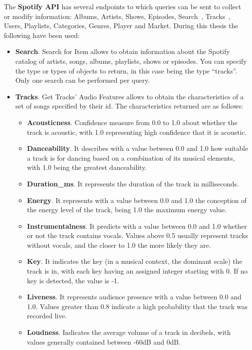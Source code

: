 \nonzeroparskip The \textbf{Spotify API} has several endpoints to which queries can be sent to collect or modify information: Albums, Artists, Shows, Episodes, Search~\cite{spotify_dev_endpoint_searchforitem}, Tracks~\cite{spotify_dev_endpoint_gettracksaudiofeatures}, Users, Playlists, Categories, Genres, Player and Market. During this thesis the following have been used:
\begin{itemize}
	\item \textbf{Search}. Search for Item allows to obtain information about the Spotify catalog of artists, songs, albums, playlists, shows or episodes. You can specify the type or types of objects to return, in this case being the type ``tracks''. Only one search can be performed per query.
	\item \textbf{Tracks}. Get Tracks' Audio Features allows to obtain the characteristics of a set of songs specified by their id. The characteristics returned are as follows:
	\begin{itemize}
		\item \textbf{Acousticness}. Confidence measure from 0.0 to 1.0 about whether the track is acoustic, with 1.0 representing high confidence that it is acoustic.
		\item \textbf{Danceability}. It describes with a value between 0.0 and 1.0 how suitable a track is for dancing based on a combination of its musical elements, with 1.0 being the greatest danceability.
		\item \textbf{Duration\_ms}. It represents the duration of the track in milliseconds.
		\item \textbf{Energy}. It represents with a value between 0.0 and 1.0 the conception of the energy level of the track, being 1.0 the maximum energy value.
		\item \textbf{Instrumentalness}. It predicts with a value between 0.0 and 1.0 whether or not the track contains vocals. Values above 0.5 usually represent tracks without vocals, and the closer to 1.0 the more likely they are.
		\item \textbf{Key}. It indicates the key (in a musical context, the dominant scale) the track is in, with each key having an assigned integer starting with 0. If no key is detected, the value is -1.
		\item \textbf{Liveness}. It represents audience presence with a value between 0.0 and 1.0. Values greater than 0.8 indicate a high probability that the track was recorded live.
		\item \textbf{Loudness}. Indicates the average volume of a track in decibels, with values generally contained between -60dB and 0dB.

\end{itemize}
\end{itemize}
